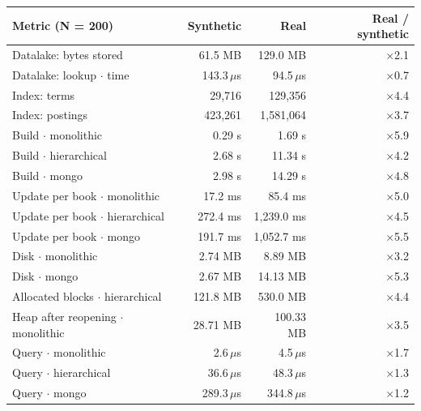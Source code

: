 \documentclass[11pt,a4paper]{article}
\newcommand{\us}{\,$\mu$s}
\begin{document}
\begin{table}[H]
\centering\small
\begin{tabular}{@{}lrrr@{}}
\toprule
Metric (N = 200) & Synthetic & Real & Real / synthetic \\
\midrule
Datalake: bytes stored & 61.5 MB & 129.0 MB & $\times$2.1 \\
Datalake: lookup $\cdot$ time & 143.3\us & 94.5\us & $\times$0.7 \\
Index: terms & 29,716 & 129,356 & $\times$4.4 \\
Index: postings & 423,261 & 1,581,064 & $\times$3.7 \\
Build $\cdot$ monolithic & 0.29 s & 1.69 s & $\times$5.9 \\
Build $\cdot$ hierarchical & 2.68 s & 11.34 s & $\times$4.2 \\
Build $\cdot$ mongo & 2.98 s & 14.29 s & $\times$4.8 \\
Update per book $\cdot$ monolithic & 17.2 ms & 85.4 ms & $\times$5.0 \\
Update per book $\cdot$ hierarchical & 272.4 ms & 1,239.0 ms & $\times$4.5 \\
Update per book $\cdot$ mongo & 191.7 ms & 1,052.7 ms & $\times$5.5 \\
Disk $\cdot$ monolithic & 2.74 MB & 8.89 MB & $\times$3.2 \\
Disk $\cdot$ mongo & 2.67 MB & 14.13 MB & $\times$5.3 \\
Allocated blocks $\cdot$ hierarchical & 121.8 MB & 530.0 MB & $\times$4.4 \\
Heap after reopening $\cdot$ monolithic & 28.71 MB & 100.33 MB & $\times$3.5 \\
Query $\cdot$ monolithic & 2.6\us & 4.5\us & $\times$1.7 \\
Query $\cdot$ hierarchical & 36.6\us & 48.3\us & $\times$1.3 \\
Query $\cdot$ mongo & 289.3\us & 344.8\us & $\times$1.2 \\
\bottomrule
\end{tabular}
\end{table}
\end{document}
